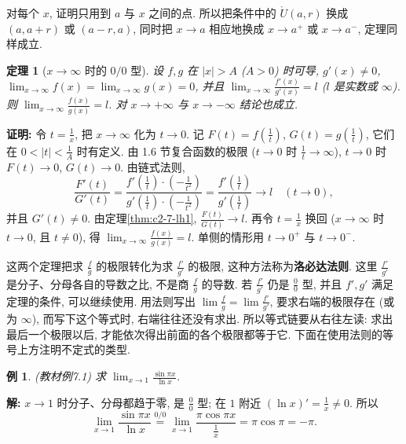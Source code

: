 \documentclass[UTF8,openany]{ctexbook}
\theoremstyle{chinesetextbook}
\newtheorem{example}{例}[section]
\newtheorem{theorem}{定理}[section]
\newenvironment{cnproof}{\par\indent\textbf{证明:} \ignorespaces}{\par}
\newenvironment{cnsolution}{\par\indent\textbf{解:} \ignorespaces}{\par}
\begin{document}
对每个 $x$, 证明只用到 $a$ 与 $x$ 之间的点. 所以把条件中的 $\mathring U(a,r)$ 换成 $(a,a+r)$ 或 $(a-r,a)$, 同时把 $x\to a$ 相应地换成 $x\to a^+$ 或 $x\to a^-$, 定理同样成立.
\begin{theorem}[$x\to\infty$ 时的 $0/0$ 型]\label{thm:c2-7-lh2}
设 $f,g$ 在 $|x|>A$ ($A>0$) 时可导, $g'(x)\ne0$, $\displaystyle\lim_{x\to\infty}f(x)=\lim_{x\to\infty}g(x)=0$, 并且 $\displaystyle\lim_{x\to\infty}\frac{f'(x)}{g'(x)}=l$ ($l$ 是实数或 $\infty$). 则 $\displaystyle\lim_{x\to\infty}\frac{f(x)}{g(x)}=l$. 对 $x\to+\infty$ 与 $x\to-\infty$ 结论也成立.
\end{theorem}
\begin{cnproof}
令 $\displaystyle t=\frac1x$, 把 $x\to\infty$ 化为 $t\to0$. 记 $\displaystyle F(t)=f\left(\frac1t\right)$, $\displaystyle G(t)=g\left(\frac1t\right)$, 它们在 $\displaystyle0<|t|<\frac1A$ 时有定义. 由 1.6 节复合函数的极限 ($t\to0$ 时 $\displaystyle\frac1t\to\infty$), $t\to0$ 时 $F(t)\to0$, $G(t)\to0$. 由链式法则,
\[
\frac{F'(t)}{G'(t)}=\frac{f'\left(\frac1t\right)\cdot\left(-\frac1{t^2}\right)}{g'\left(\frac1t\right)\cdot\left(-\frac1{t^2}\right)}=\frac{f'\left(\frac1t\right)}{g'\left(\frac1t\right)}\to l\quad(t\to0),
\]
并且 $G'(t)\ne0$. 由定理\ref{thm:c2-7-lh1}, $\displaystyle\frac{F(t)}{G(t)}\to l$. 再令 $\displaystyle t=\frac1x$ 换回 ($x\to\infty$ 时 $t\to0$, 且 $t\ne0$), 得 $\displaystyle\lim_{x\to\infty}\frac{f(x)}{g(x)}=l$. 单侧的情形用 $t\to0^+$ 与 $t\to0^-$.
\end{cnproof}
这两个定理把求 $\displaystyle\frac fg$ 的极限转化为求 $\displaystyle\frac{f'}{g'}$ 的极限, 这种方法称为\textbf{洛必达法则}. 这里 $\displaystyle\frac{f'}{g'}$ 是分子、分母各自的导数之比, 不是商 $\displaystyle\frac fg$ 的导数. 若 $\displaystyle\frac{f'}{g'}$ 仍是 $\displaystyle\frac00$ 型, 并且 $f',g'$ 满足定理的条件, 可以继续使用. 用法则写出 $\displaystyle\lim\frac fg=\lim\frac{f'}{g'}$, 要求右端的极限存在 (或为 $\infty$), 而写下这个等式时, 右端往往还没有求出. 所以等式链要从右往左读: 求出最后一个极限以后, 才能依次得出前面的各个极限都等于它. 下面在使用法则的等号上方注明不定式的类型.
\begin{example}\label{ex:c2-7-1}
\textnormal{(教材例7.1)} 求 $\displaystyle\lim_{x\to1}\frac{\sin\pi x}{\ln x}$.
\end{example}
\begin{cnsolution}
$x\to1$ 时分子、分母都趋于零, 是 $\displaystyle\frac00$ 型; 在 $1$ 附近 $\displaystyle(\ln x)'=\frac1x\ne0$. 所以
\[
\lim_{x\to1}\frac{\sin\pi x}{\ln x}\overset{0/0}{=}\lim_{x\to1}\frac{\pi\cos\pi x}{\frac1x}=\pi\cos\pi=-\pi.
\]
\end{cnsolution}
\end{document}
